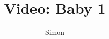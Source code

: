 \documentclass[a4paper,11pt]{article}
\title{Video: Baby 1}
\author{Simon}
\begin{document}
\maketitle

\begin{sketch}


\end{sketch}
\end{document}
